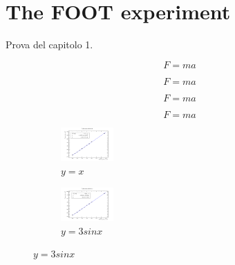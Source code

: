 \chapter{The FOOT experiment}


Prova del capitolo 1.

\begin{equation}
    F = ma
\end{equation}


\begin{equation}
    F = ma
\end{equation}


\begin{equation}
    F = ma
\end{equation}


\begin{equation}
    F = ma
\end{equation}

\begin{figure}
    \centering
    \begin{subfigure}[b]{0.15\textwidth}
        \centering
        \includegraphics[width=2cm]{figures/ch0.pdf}
        \caption{$y=x$}
        \label{fig:y equals x}
    \end{subfigure}
    \hfill
    \begin{subfigure}[b]{0.15\textwidth}
        \centering
        \includegraphics[width=2cm]{figures/ch1.pdf}
        \caption{$y=3sinx$}
        \label{fig:three sin x}
    \end{subfigure}
\end{figure}






